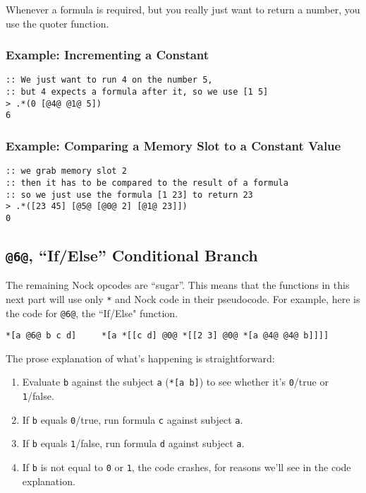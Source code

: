 \documentclass[twoside]{article}
\begin{document}
Whenever a formula is required, but you really just want to return a number, you use the quoter function.

\subsubsection{Example: Incrementing a Constant}

\begin{lstlisting}[style=listingcode]
:: We just want to run 4 on the number 5,
:: but 4 expects a formula after it, so we use [1 5]
> .*(0 [@4@ @1@ 5])
6
\end{lstlisting}

\subsubsection{Example: Comparing a Memory Slot to a Constant Value}

\begin{lstlisting}[style=listingcode]
:: we grab memory slot 2
:: then it has to be compared to the result of a formula
:: so we just use the formula [1 23] to return 23
> .*([23 45] [@5@ [@0@ 2] [@1@ 23]])
0
\end{lstlisting}

\subsection{\lstinline[style=inlinecode]{@6@}, “If/Else” Conditional Branch}

The remaining Nock opcodes are ``sugar''.  This means that the functions in this next part will use only \lstinline[style=inlinecode]{*} and Nock code in their pseudocode. For example, here is the code for \lstinline[style=inlinecode]{@6@}, the ``If/Else" function.

\begin{lstlisting}[style=listingcode]
*[a @6@ b c d]     *[a *[[c d] @0@ *[[2 3] @0@ *[a @4@ @4@ b]]]]
\end{lstlisting}

The prose explanation of what's happening is straightforward:

\begin{enumerate}
  \item  Evaluate \lstinline[style=inlinecode]{b} against the subject \lstinline[style=inlinecode]{a} (\lstinline[style=inlinecode]{*[a b]}) to see whether it's \lstinline[style=inlinecode]{0}/true or \lstinline[style=inlinecode]{1}/false. 
  \item  If \lstinline[style=inlinecode]{b} equals \lstinline[style=inlinecode]{0}/true, run formula \lstinline[style=inlinecode]{c} against subject \lstinline[style=inlinecode]{a}.
  \item  If \lstinline[style=inlinecode]{b} equals \lstinline[style=inlinecode]{1}/false, run formula \lstinline[style=inlinecode]{d} against subject \lstinline[style=inlinecode]{a}.
  \item  If \lstinline[style=inlinecode]{b} is not equal to \lstinline[style=inlinecode]{0} or \lstinline[style=inlinecode]{1}, the code crashes, for reasons we'll see in the code explanation.
\end{enumerate}
\end{document}
